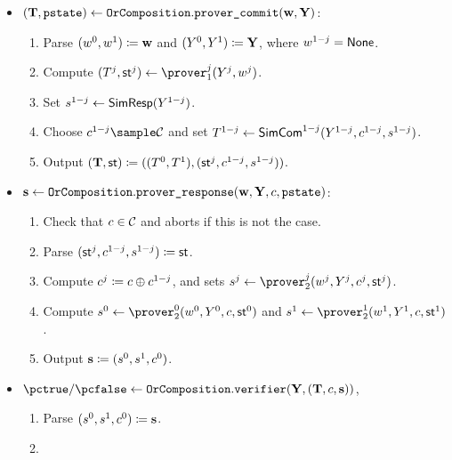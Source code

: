 \documentclass[runningheads,11pt]{article}
\begin{document}
\begin{itemize}
  \item
  $(\mathbf {T}, \texttt{pstate})\gets \texttt{OrComposition}.\texttt{prover\_commit}(\mathbf {w}, \mathbf {Y})$:
    \begin{enumerate}
      \item
        Parse $(w^0,w^1)\coloneqq \mathbf {w}$ and $(Y^0,Y^1)\coloneqq \mathbf {Y}$, where $w^{1-j}=\mathsf{None}$.
      \item
        Compute $(\commitment^j,\st^j)\gets\prover_1^j(\statement^j,\witness^j)$.
      \item
			  Set $s^{1-j}\gets\textsf{SimResp}(Y^{1-j})$.
			\item
        Choose $\challenge^{1-j}\sample\CS$ and set $T^{1-j}\gets\textsf{SimCom}^{1-j}(Y^{1-j},c^{1-j},s^{1-j})$.
      \item
	Output $(\mathbf {T},\mathsf{st}) \coloneqq ((T^0,T^1),(\mathsf{st}^j,c^{1-j},s^{1-j}))$.
    \end{enumerate}
  \item
  $\mathbf {s} \gets \texttt{OrComposition}.\texttt{prover\_response}(\mathbf {w}, \mathbf {Y}, c, \texttt{pstate})$:
    \begin{enumerate}
      \item
        Check that $c\in\mathcal{C}$ and aborts if this is not the case.
      \item Parse $(\mathsf{st}^j,c^{1-j},s^{1-j})\coloneqq\mathsf{st}$.
      \item
        Compute $c^j\coloneqq c\oplus c^{1-j}$, and sets $\response^j\gets\prover_2^j(\witness^j,\statement^j,\challenge^j,\st^j)$.
      \item
        Compute $\response^0\gets\prover_2^0(\witness^0,\statement^0,\challenge,\st^0)$ and $\response^1\gets\prover_2^1(\witness^1,\statement^1,\challenge,\st^1)$.
      \item
        Output $\mathbf {s}\coloneqq(s^0,s^1, c^0)$.
    \end{enumerate}
  \item
  $\accept/\reject \gets \orcomposition.\verifiertt(\vec \statement, (\vec \commitment, \challenge, \vec \response))$,
    \begin{enumerate}
      \item
        Parse $(s^0, s^1, c^0)\coloneqq \mathbf {s}$.
      \item

\end{enumerate}
\end{itemize}
\end{document}
